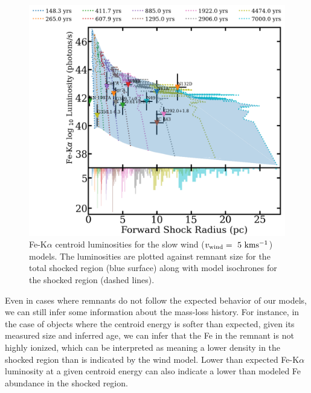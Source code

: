 \documentclass[twocolumn]{aastex631}
\begin{document}
\begin{figure}[htb]
    \centering
    \includegraphics[scale=0.21]{fsradslow.png}
    \caption{Fe-K$\alpha$ centroid luminosities for the slow wind ($v_{\rm wind}=~5~\rm kms^{-1}$) models. The luminosities are plotted against remnant size for the total shocked region (blue surface) along with model isochrones for the shocked region (dashed lines).}
    \label{fig:fast-rad-fs}
\end{figure}

Even in cases where remnants do not follow the expected behavior of our models, we can still infer some information about the mass-loss history. For instance, in the case of objects where the centroid energy is softer than expected, given its measured size and inferred age, we can infer that the Fe in the remnant is not highly ionized, which can be interpreted as meaning a lower density in the shocked region than is indicated by the wind model. Lower than expected Fe-K$\alpha$ luminosity at a given centroid energy can also indicate a lower than modeled Fe abundance in the shocked region.
\end{document}
